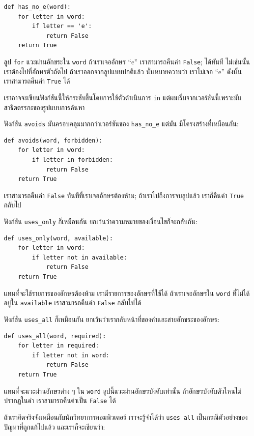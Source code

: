 \begin{verbatim}
def has_no_e(word):
    for letter in word:
        if letter == 'e':
            return False
    return True
\end{verbatim}
%
ลูป {\tt for} แวะผ่านอักขระใน {\tt word} ถ้าเราเจออักษร ``e'' เราสามารถคืนค่า {\tt False};
ได้ทันที ไม่เช่นนั้น เราต้องไปที่อักษรตัวถัดไป  ถ้าเราออกจากลูปแบบปกติแล้ว นั่นหมายความว่า
เราไม่เจอ ``e'' ดังนั้น เราสามารถคืนค่า {\tt True} ได้


เราอาจจะเขียนฟังก์ชันนี้ให้กระชับขึ้นโดยการใช้ตัวดำเนินการ {\tt in} 
แต่ผมเริ่มจากเวอร์ชันนี้เพราะมันสาธิตตรรกะของรูปแบบการค้นหา

ฟังก์ชัน {\tt avoids} มันครอบคลุมมากกว่าเวอร์ชันของ \verb"has_no_e" แต่มัน
มีโครงสร้างที่เหมือนกัน:

\begin{verbatim}
def avoids(word, forbidden):
    for letter in word:
        if letter in forbidden:
            return False
    return True
\end{verbatim}
%
เราสามารถคืนค่า {\tt False} ทันทีที่เราเจออักษรต้องห้าม; ถ้าเราไปถึงการจบลูปแล้ว
เราก็คืนค่า {\tt True} กลับไป

ฟังก์ชัน \verb"uses_only" ก็เหมือนกัน ยกเว้นว่าความหมายของเงื่อนไขก็จะกลับกัน: 

\begin{verbatim}
def uses_only(word, available):
    for letter in word: 
        if letter not in available:
            return False
    return True
\end{verbatim}
%
แทนที่จะใช้รายการของอักษรต้องห้าม เรามีรายการของอักษรที่ใช้ได้ ถ้าเราเจออักษรใน 
{\tt word} ที่ไม่ได้อยู่ใน {\tt available} เราสามารถคืนค่า {\tt False} 
กลับไปได้

ฟังก์ชัน \verb"uses_all" ก็เหมือนกัน ยกเว้นว่าเรากลับหน้าที่ของคำและสายอักขระของอักษร:

\begin{verbatim}
def uses_all(word, required):
    for letter in required: 
        if letter not in word:
            return False
    return True
\end{verbatim}
%
แทนที่จะแวะผ่านอักษรต่าง ๆ ใน {\tt word} ลูปนี้แวะผ่านอักษรบังคับเท่านั้น ถ้าอักษรบังคับตัวไหนไม่ปรากฏในคำ 
เราสามารถคืนค่าเป็น {\tt False} ได้

ถ้าเราคิดจริงจังเหมือนกับนักวิทยาการคอมพิวเตอร์ เราจะรู้จำได้ว่า \verb"uses_all"
เป็นกรณีตัวอย่างของปัญหาที่ถูกแก้ไปแล้ว และเราก็จะเขียนว่า:

